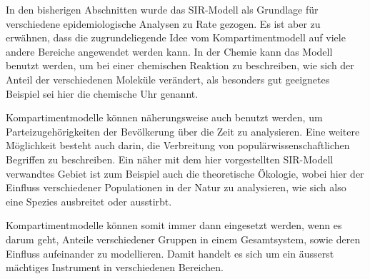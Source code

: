 \begin{refsection}
In den bisherigen Abschnitten wurde das SIR-Modell als Grundlage für verschiedene epidemiologische Analysen zu Rate gezogen.
Es ist aber zu erwähnen, dass die zugrundeliegende Idee vom Kompartimentmodell auf viele andere Bereiche angewendet werden kann.
In der Chemie kann das Modell benutzt werden, um bei einer chemischen Reaktion zu beschreiben, wie sich der Anteil der verschiedenen Moleküle verändert, als besonders gut geeignetes Beispiel sei hier die chemische Uhr genannt.

Kompartimentmodelle können näherungsweise auch benutzt werden, um Parteizugehörigkeiten der Bevölkerung über die Zeit zu analysieren. 
Eine weitere Möglichkeit besteht auch darin, die Verbreitung von populärwissenschaftlichen Begriffen zu beschreiben. 
Ein näher mit dem hier vorgestellten SIR-Modell verwandtes Gebiet ist zum Beispiel auch die theoretische Ökologie, wobei hier der Einfluss verschiedener Populationen in der Natur zu analysieren, wie sich also eine Spezies ausbreitet oder ausstirbt.

Kompartimentmodelle können somit immer dann eingesetzt werden, wenn es darum geht, Anteile verschiedener Gruppen in einem Gesamtsystem, sowie deren Einfluss aufeinander zu modellieren. 
Damit handelt es sich um ein äusserst mächtiges Instrument in verschiedenen Bereichen. 


\printbibliography[heading=subbibliography]
\end{refsection}

